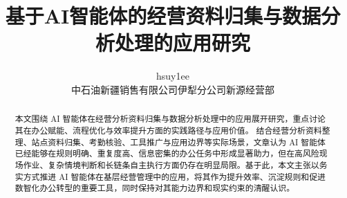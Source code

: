 \documentclass[lang=cn,a4paper,newtx]{cnpc_xsy}
\title{基于AI智能体的经营资料归集与数据分析处理的应用研究}
\author{hsuy1ee \\ 中石油新疆销售有限公司伊犁分公司新源经营部}
\date{\zhdate{2026/04/12}}
\begin{document}

\maketitle
\vspace{1.5em}

\begin{abstract}
    本文围绕 AI 智能体在经营分析资料归集与数据分析处理中的应用展开研究，重点讨论其在办公赋能、流程优化与效率提升方面的实践路径与应用价值。
    结合经营分析资料整理、站点资料归集、考勤核验、工具推广与应用边界等实际场景，文章认为 AI 智能体已经能够在规则明确、重复度高、信息密集的办公任务中形成显著助力，但在高风险现场作业、复杂情境判断和长链条自主执行方面仍存在明显局限。基于此，本文主张以务实方式推进 AI 智能体在基层经营管理中的应用，将其作为提升效率、沉淀规则和促进数智化办公转型的重要工具，同时保持对其能力边界和现实约束的清醒认识。
\end{abstract}

\clearpage
\tableofcontents
\thispagestyle{empty}
\clearpage
{}
\setcounter{page}{1}







\printbibliography[heading=bibintoc,title=\ebibname]
\end{document}
